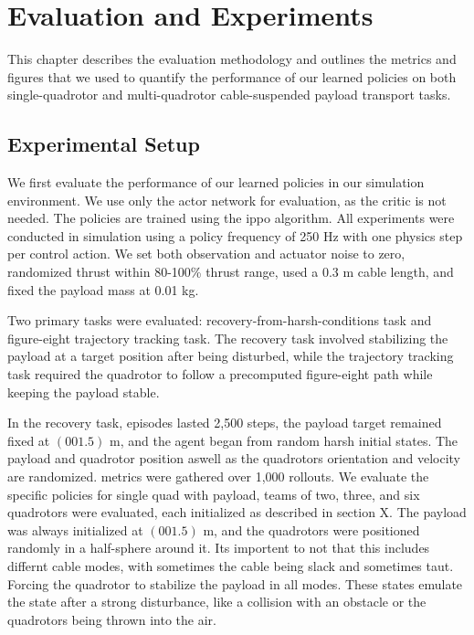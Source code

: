 \chapter{Evaluation and Experiments}

This chapter describes the evaluation methodology and outlines the metrics and figures that we used to quantify the performance of our learned policies on both single-quadrotor and multi-quadrotor cable-suspended payload transport tasks.

\section{Experimental Setup}
We first evaluate the performance of our learned policies in our simulation environment. We use only the actor network for evaluation, as the critic is not needed. The policies are trained using the \gls{ippo} algorithm.
All experiments were conducted in simulation using a policy frequency of 250 Hz with one physics step per control action. We set both observation and actuator noise to zero, randomized thrust within 80-100\% thrust range, used a 0.3 m cable length, and fixed the payload mass at 0.01 kg. 

Two primary tasks were evaluated: 
 recovery-from-harsh-conditions task and figure-eight trajectory tracking task. The recovery task involved stabilizing the payload at a target position after being disturbed, while the trajectory tracking task required the quadrotor to follow a precomputed figure-eight path while keeping the payload stable.

In the recovery task, episodes lasted 2,500 steps, the payload target remained fixed at $(0 0 1.5)$ m, and the agent began from random harsh initial states. The payload and quadrotor position aswell as the quadrotors orientation and velocity are randomized.
 metrics were gathered over 1,000 rollouts. We evaluate the specific policies for single quad with payload, teams of two, three, and six quadrotors were evaluated, each initialized as described in section X. The payload was always initialized at $(0 0 1.5)$ m, and the quadrotors were positioned randomly in a half-sphere around it. Its importent to not that this includes differnt cable modes, with sometimes the cable being slack and sometimes taut. Forcing the quadrotor to stabilize the payload in all modes. These states emulate the state after a strong disturbance, like a collision with an obstacle or the quadrotors being thrown into the air.

